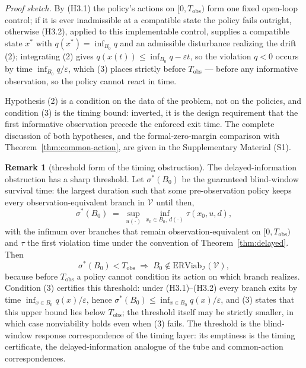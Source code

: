 \documentclass[10pt,twocolumn]{article}
\theoremstyle{definition}
\newtheorem{remark}{Remark}
\begin{document}
\emph{Proof sketch.} By (H3.1) the policy's actions on \([0, T_{\mathrm{obs}})\) form one fixed open-loop control; if it is ever inadmissible at a compatible state the policy fails outright, otherwise (H3.2), applied to this implementable control, supplies a compatible state \(x^*\) with \(q(x^*) = \inf_{B_0} q\) and an admissible disturbance realizing the drift (2); integrating (2) gives \(q(x(t)) \le \inf_{B_0} q - \varepsilon t\), so the violation \(q < 0\) occurs by time \(\inf_{B_0} q / \varepsilon\), which (3) places strictly before \(T_{\mathrm{obs}}\) --- before any informative observation, so the policy cannot react in time.

Hypothesis (2) is a condition on the data of the problem, not on the policies, and condition (3) is the timing bound: inverted, it is the design requirement that the first informative observation precede the enforced exit time. The complete discussion of both hypotheses, and the formal-zero-margin comparison with Theorem~\ref{thm:common-action}, are given in the Supplementary Material (S1).

\begin{remark}[threshold form of the timing obstruction]\label{rem:sigma}
The delayed-information obstruction has a sharp threshold. Let
\(\sigma^*(B_0)\) be the guaranteed blind-window survival time: the
largest duration such that some pre-observation policy keeps every
observation-equivalent branch in \(\mathcal{V}\) until then,
\[\sigma^*(B_0) \;=\; \sup_{u(\cdot)} \inf_{x_0\in B_0,\, d(\cdot)} \tau(x_0,u,d),\]
with the infimum over branches that remain observation-equivalent on
\([0,T_{\mathrm{obs}})\) and \(\tau\) the first violation time under the
convention of Theorem~\ref{thm:delayed}. Then
\[\sigma^*(B_0) < T_{\mathrm{obs}} \;\Longrightarrow\; B_0 \notin \mathrm{ERViab}_{\mathcal{I}}(\mathcal{V}),\]
because before \(T_{\mathrm{obs}}\) a policy cannot condition its action
on which branch realizes. Condition (3) certifies this threshold: under
(H3.1)--(H3.2) every branch exits by time
\(\inf_{x\in B_0}q(x)/\varepsilon\), hence
\(\sigma^*(B_0)\le\inf_{x\in B_0}q(x)/\varepsilon\), and (3) states that
this upper bound lies below \(T_{\mathrm{obs}}\); the threshold itself
may be strictly smaller, in which case nonviability holds even when (3)
fails. The threshold is the blind-window response correspondence of the
timing layer: its emptiness is the timing certificate, the
delayed-information analogue of the tube and common-action
correspondences.
\end{remark}
\end{document}
